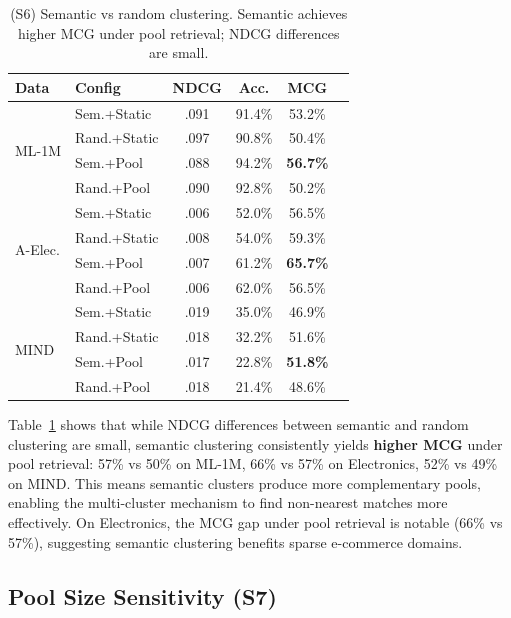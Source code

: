\documentclass[sigconf,nonacm=false]{acmart}
\begin{document}
\begin{table}[t]
\centering
\caption{(S6) Semantic vs random clustering. Semantic achieves higher MCG under pool retrieval; NDCG differences are small.}
\label{tab:s6}
\small
\begin{tabular}{ll cccc}
\toprule
\textbf{Data} & \textbf{Config} & \textbf{NDCG} & \textbf{Acc.} & \textbf{MCG} \\
\midrule
\multirow{4}{*}{ML-1M}
& Sem.+Static & .091 & 91.4\% & 53.2\% \\
& Rand.+Static & .097 & 90.8\% & 50.4\% \\
& \cellcolor{gray!15} Sem.+Pool & \cellcolor{gray!15} .088 & \cellcolor{gray!15} 94.2\% & \cellcolor{gray!15} \textbf{56.7\%} \\
& Rand.+Pool & .090 & 92.8\% & 50.2\% \\
\midrule
\multirow{4}{*}{A-Elec.}
& Sem.+Static & .006 & 52.0\% & 56.5\% \\
& Rand.+Static & .008 & 54.0\% & 59.3\% \\
& \cellcolor{gray!15} Sem.+Pool & \cellcolor{gray!15} .007 & \cellcolor{gray!15} 61.2\% & \cellcolor{gray!15} \textbf{65.7\%} \\
& Rand.+Pool & .006 & 62.0\% & 56.5\% \\
\midrule
\multirow{4}{*}{MIND}
& Sem.+Static & .019 & 35.0\% & 46.9\% \\
& Rand.+Static & .018 & 32.2\% & 51.6\% \\
& \cellcolor{gray!15} Sem.+Pool & \cellcolor{gray!15} .017 & \cellcolor{gray!15} 22.8\% & \cellcolor{gray!15} \textbf{51.8\%} \\
& Rand.+Pool & .018 & 21.4\% & 48.6\% \\
\bottomrule
\end{tabular}
\end{table}

Table~\ref{tab:s6} shows that while NDCG differences between semantic and random clustering are small, semantic clustering consistently yields \textbf{higher MCG} under pool retrieval: 57\% vs 50\% on ML-1M, 66\% vs 57\% on Electronics, 52\% vs 49\% on MIND. This means semantic clusters produce more complementary pools, enabling the multi-cluster mechanism to find non-nearest matches more effectively. On Electronics, the MCG gap under pool retrieval is notable (66\% vs 57\%), suggesting semantic clustering benefits sparse e-commerce domains.

\subsection{Pool Size Sensitivity (S7)}
\label{sec:exp_s7}
\end{document}
